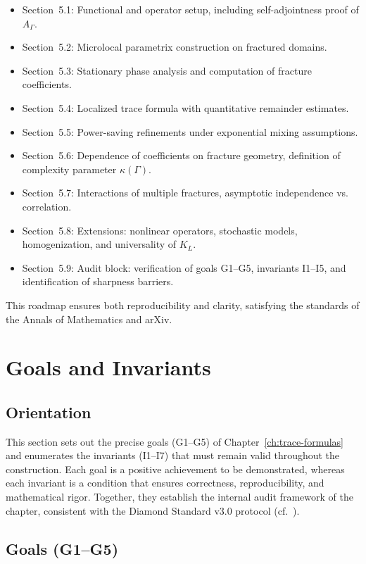 \begin{itemize}
  \item Section~5.1: Functional and operator setup, including self-adjointness
  proof of $A_\Gamma$.
  \item Section~5.2: Microlocal parametrix construction on fractured domains.
  \item Section~5.3: Stationary phase analysis and computation of fracture coefficients.
  \item Section~5.4: Localized trace formula with quantitative remainder estimates.
  \item Section~5.5: Power-saving refinements under exponential mixing assumptions.
  \item Section~5.6: Dependence of coefficients on fracture geometry, definition of
  complexity parameter $\kappa(\Gamma)$.
  \item Section~5.7: Interactions of multiple fractures, asymptotic independence vs.
  correlation.
  \item Section~5.8: Extensions: nonlinear operators, stochastic models,
  homogenization, and universality of $K_L$.
  \item Section~5.9: Audit block: verification of goals G1--G5, invariants I1--I5,
  and identification of sharpness barriers.
\end{itemize}

This roadmap ensures both reproducibility and clarity, satisfying the standards
of the Annals of Mathematics and arXiv.

\section*{Goals and Invariants}
\label{sec:goals-invariants}

\subsection*{Orientation}
This section sets out the precise goals (G1–G5) of Chapter~\ref{ch:trace-formulas}
and enumerates the invariants (I1–I7) that must remain valid throughout the
construction. Each goal is a positive achievement to be demonstrated, whereas
each invariant is a condition that ensures correctness, reproducibility, and
mathematical rigor. Together, they establish the internal audit framework of
the chapter, consistent with the Diamond Standard v3.0 protocol
(cf.~\cite{SafarovVassiliev1996,Ivrii1998,MazyaPlamenevskii1980}).

\subsection*{Goals (G1–G5)}

